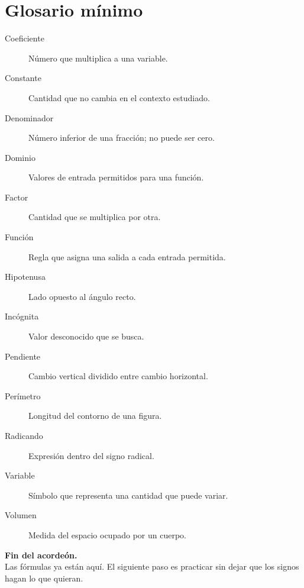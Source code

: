 \documentclass[10pt,oneside,openany]{book}
\begin{document}
\chapter{Glosario mínimo}
\begin{description}
\item[Coeficiente] Número que multiplica a una variable.
\item[Constante] Cantidad que no cambia en el contexto estudiado.
\item[Denominador] Número inferior de una fracción; no puede ser cero.
\item[Dominio] Valores de entrada permitidos para una función.
\item[Factor] Cantidad que se multiplica por otra.
\item[Función] Regla que asigna una salida a cada entrada permitida.
\item[Hipotenusa] Lado opuesto al ángulo recto.
\item[Incógnita] Valor desconocido que se busca.
\item[Pendiente] Cambio vertical dividido entre cambio horizontal.
\item[Perímetro] Longitud del contorno de una figura.
\item[Radicando] Expresión dentro del signo radical.
\item[Variable] Símbolo que representa una cantidad que puede variar.
\item[Volumen] Medida del espacio ocupado por un cuerpo.
\end{description}

\begin{center}
\vspace{1cm}
\Large\textbf{Fin del acordeón.}\\
\normalsize Las fórmulas ya están aquí. El siguiente paso es practicar sin dejar que los signos hagan lo que quieran.
\end{center}
\end{document}
